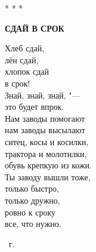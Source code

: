 \begin{center}
    * * *
\end{center}

\begin{center}
    \textbf{СДАЙ В СРОК}
\end{center}

\hspace{4cm}
\parbox{10cm}{
Хлеб сдай, \\
лён сдай, \\
хлопок сдай \\
в срок!\\

Знай, знай, знай, "--- \\
это будет впрок. \\
Нам заводы помогают \\
нам заводы высылают\\
ситец, косы и косилки, \\
трактора и молотилки,\\

обувь крепкую из кожи. \\
Ты заводу вышли тоже, \\
только быстро, \\
только дружно,\\
ровно к сроку \\
все, что нужно. 
}

{\raggedleft
	\parbox{6cm}{~г.
	}

}